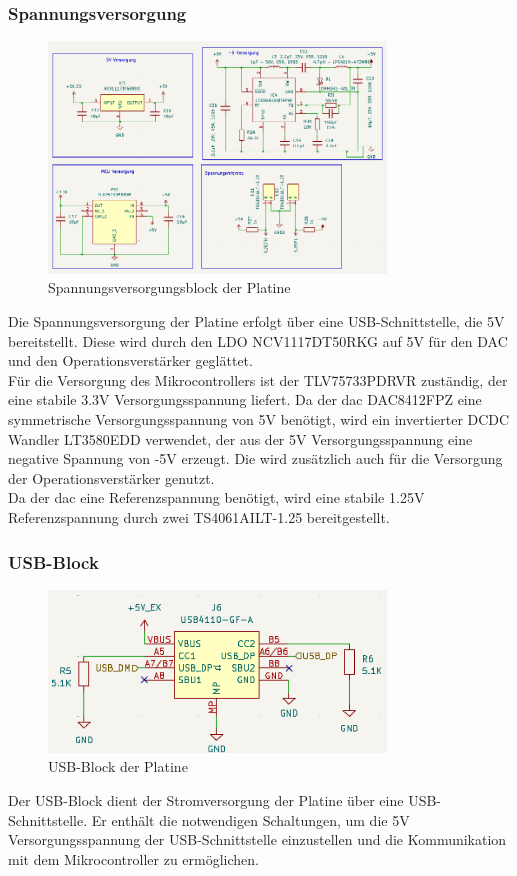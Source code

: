 \subsubsection{Spannungsversorgung}
\begin{figure}[H]
    \centering
    \includegraphics[width=0.8\textwidth]{bilder/Bipolar_Power.png}
    \caption{Spannungsversorgungsblock der Platine}
    \label{fig:spannungsversorgung}
\end{figure}
Die Spannungsversorgung der Platine erfolgt über eine USB-Schnittstelle, die 5V bereitstellt. 
Diese wird durch den LDO NCV1117DT50RKG auf 5V für den DAC und den Operationsverstärker geglättet.\\
Für die Versorgung des Mikrocontrollers ist der TLV75733PDRVR zuständig, der eine stabile 3.3V Versorgungsspannung liefert.
Da der \gls{dac} DAC8412FPZ eine symmetrische Versorgungsspannung von \pm 5V benötigt, wird ein invertierter DCDC Wandler LT3580EDD verwendet, der aus der 5V Versorgungsspannung eine negative Spannung von -5V erzeugt. Die wird zusätzlich auch für die Versorgung der Operationsverstärker genutzt.\\
Da der \gls{dac} eine Referenzspannung benötigt, wird eine stabile \pm 1.25V Referenzspannung durch zwei TS4061AILT-1.25 bereitgestellt. 

\subsubsection{USB-Block}
\begin{figure}[H]
    \centering
    \includegraphics[width=0.8\textwidth]{bilder/USBC_Port.png}
    \caption{USB-Block der Platine}
    \label{fig:usb_block}
\end{figure}
Der USB-Block dient der Stromversorgung der Platine über eine USB-Schnittstelle. Er enthält die notwendigen Schaltungen, um die 5V Versorgungsspannung der USB-Schnittstelle einzustellen und die Kommunikation mit dem Mikrocontroller zu ermöglichen.\\